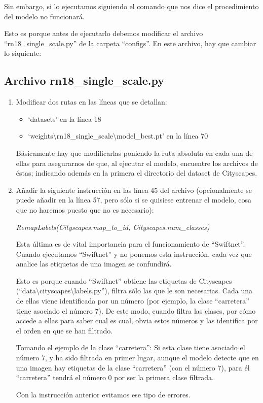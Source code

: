Sin embargo, si lo ejecutamos siguiendo el comando que nos dice el procedimiento del modelo no funcionará.

Esto es porque antes de ejecutarlo debemos modificar el archivo ``rn18\_single\_scale.py'' de la carpeta ``configs''. En este archivo, hay que cambiar lo siquiente:

\subsection{Archivo rn18\_single\_scale.py}

\begin{enumerate}
\item Modificar dos rutas en las líneas que se detallan:
\begin{itemize}
\item `datasets' en la línea 18
\item `weights\textbackslash{rn18\_single\_scale}\textbackslash{model\_best.pt}' en la línea 70
\end{itemize}

Básicamente hay que modificarlas poniendo la ruta absoluta en cada una de ellas para asegurarnos de que, al ejecutar el modelo, encuentre los archivos de éstas; indicando además en la primera el directorio del dataset de Cityscapes.

\item Añadir la siguiente instrucción en las línea 45 del archivo (opcionalmente se puede añadir en la línea 57, pero sólo si se quisiese entrenar el modelo, cosa que no haremos puesto que no es necesario):

\begin{center}
\textit{RemapLabels(Cityscapes.map\_to\_id, Cityscapes.num\_classes)}
\end{center}

Esta última es de vital importancia para el funcionamiento de ``Swiftnet''. Cuando ejecutamos ``Swiftnet'' y no ponemos esta instrucción, cada vez que analice las etiquetas de una imagen se confundirá.

Esto es porque cuando ``Swiftnet'' obtiene las etiquetas de Cityscapes (``data\textbackslash{cityscapes}\textbackslash{labels.py}''), filtra sólo las que le son necesarias. Cada una de ellas viene identificada por un número (por ejemplo, la clase ``carretera'' tiene asociado el número 7). De este modo, cuando filtra las clases, por cómo accede a ellas para saber cual es cual, obvia estos números y las identifica por el orden en que se han filtrado.

Tomando el ejemplo de la clase ``carretera'': Si esta clase tiene asociado el número 7, y ha sido filtrada en primer lugar, aunque el modelo detecte que en una imagen hay etiquetas de la clase ``carretera'' (con el número 7), para él ``carretera'' tendrá el número 0 por ser la primera clase filtrada.

Con la instrucción anterior evitamos ese tipo de errores.
\end{enumerate}

